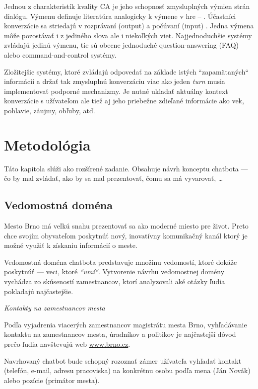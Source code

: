 \documentclass{ExcelAtFIT}
\begin{document}
Jednou z charakteristík kvality CA je jeho schopnosť zmysluplných výmien strán dialógu. Výmenu definuje literatúra analogicky k výmene v hre -- \textit{}. 
Účastníci konverzácie sa striedajú v rozprávaní (output) a počúvaní (input) \cite{jurafsky_2019}. Jedna výmena môže pozostávať i z jediného slova ale i niekoľkých viet. Najjednoduchšie systémy zvládajú jedinú výmenu, tie sú obecne jednoduché question-answering (FAQ) alebo command-and-control systémy.

Zložitejšie systémy, ktoré zvládajú odpovedať na základe istých ``zapamätaných`` informácií a držať tak zmysluplnú konverzáciu viac ako jeden \textit{turn} musia implementovať podporné mechanizmy.
Je nutné ukladať aktuálny kontext konverzácie s užívateľom ale tiež aj jeho priebežne zdieľané informácie ako vek, pohlavie, záujmy, obľuby, atď.


\section{Metodológia}

Táto kapitola slúži ako rozšírené zadanie. Obsahuje návrh konceptu chatbota --- čo by mal zvládať, ako by sa mal prezentovať, čomu sa má vyvarovať, \dots

\subsection{Vedomostná doména}
Mesto Brno má veľkú snahu prezentovať sa ako moderné miesto pre život. Preto chce svojím obyvateľom poskytnúť nový, inovatívny komunikačný kanál ktorý je možné využiť k získaniu informácií o meste.

Vedomostná doména chatbota predstavuje množinu vedomostí, ktoré dokáže poskytnúť --- veci, ktoré \emph{``umí``}. Vytvorenie návrhu vedomostnej domény vychádza zo skúseností zamestnancov, ktorí analyzovali aké otázky ľudia pokladajú najčastejšie.

\vspace{2mm}
\textit{Kontakty na zamestnancov mesta}


\noindent Podľa vyjadrenia viacerých zamestnancov magistrátu mesta Brno, vyhľadávanie kontaktu na zamestnancov mesta, úradníkov a politikov je najčastejší dôvod prečo ľudia navštevujú web \url{www.brno.cz}.

Navrhovaný chatbot bude schopný rozoznať zámer užívateľa vyhľadať kontakt (telefón, e-mail, adresu pracoviska) na konkrétnu osobu podľa mena (Ján Novák) alebo pozície (primátor mesta).
\end{document}
